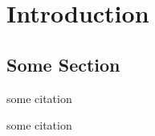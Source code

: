 
\chapter{Introduction}
\label{ch:Introduction}

\section{Some Section}
\label{sec:SomeSection}

some citation~\citet{test1}

some citation~\citet{test2}

\endinput

Any text after an \endinput is ignored.
You could put scraps here or things in progress.
